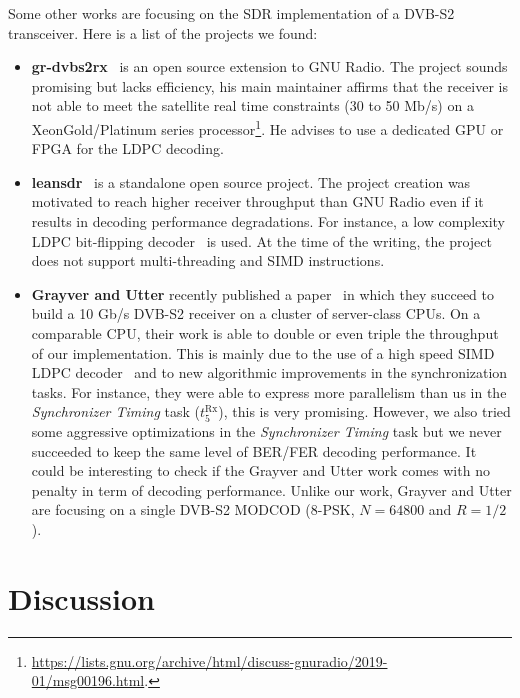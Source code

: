 Some other works are focusing on the SDR implementation of a DVB-S2 transceiver.
Here is a list of the projects we found:
\begin{itemize}
  \item \textbf{gr-dvbs2rx}~\cite{gr-dvbs2rx} is an open source extension to GNU
    Radio. The project sounds promising but lacks efficiency, his main
    maintainer affirms that the receiver is not able to meet the satellite real
    time constraints (30 to 50 Mb/s) on a Xeon\TM Gold/Platinum series
    processor\footnote{\url{https://lists.gnu.org/archive/html/discuss-gnuradio/2019-01/msg00196.html}.}.
    He advises to use a dedicated GPU or FPGA for the LDPC decoding.
  \item \textbf{leansdr}~\cite{leansdr} is a standalone open source project. The
    project creation was motivated to reach higher receiver throughput than GNU
    Radio even if it results in decoding performance degradations. For instance,
    a low complexity LDPC bit-flipping decoder~\cite{Ryan2009} is used. At the
    time of the writing, the project does not support multi-threading and SIMD
    instructions.
  \item \textbf{Grayver and Utter} recently published a paper~\cite{Grayver2020}
    in which they succeed to build a 10 Gb/s DVB-S2 receiver on a cluster of
    server-class CPUs. On a comparable CPU, their work is able to double or even
    triple the throughput of our implementation. This is mainly due to the use
    of a high speed SIMD LDPC decoder~\cite{LeGal2016,Grayver2019} and to new
    algorithmic improvements in the synchronization tasks. For instance, they
    were able to express more parallelism than us in the \emph{Synchronizer
    Timing} task ($t^\text{Rx}_{5}$), this is very promising. However, we also
    tried some aggressive optimizations in the \emph{Synchronizer Timing} task
    but we never succeeded to keep the same level of BER/FER decoding
    performance. It could be interesting to check if the Grayver and Utter work
    comes with no penalty in term of decoding performance. Unlike our work,
    Grayver and Utter are focusing on a single DVB-S2 MODCOD (8-PSK, $N = 64800$
    and $R = 1/2$).
\end{itemize}

\section{Discussion}


